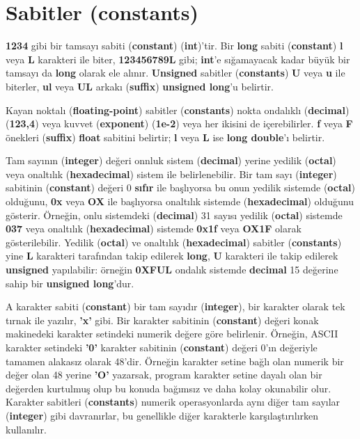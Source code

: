 \documentclass[a4paper,12pt,oneside]{book}
\begin{document}
\section{Sabitler (\textbf{constants})}
\textbf{1234} gibi bir tamsayı sabiti (\textbf{constant}) (\textbf{int})'tir. Bir \textbf{long} sabiti (\textbf{constant}) \textbf{l} veya \textbf{L} karakteri ile biter, \textbf{123456789L} gibi; \textbf{int}'e sığamayacak kadar büyük bir tamsayı da \textbf{long} olarak ele alınır. \textbf{Unsigned} sabitler (\textbf{constants}) \textbf{U} veya \textbf{u} ile biterler, \textbf{ul} veya \textbf{UL} arkakı (\textbf{suffix}) \textbf{unsigned long}'u belirtir.
\par Kayan noktalı (\textbf{floating-point}) sabitler (\textbf{constants}) nokta ondalıklı (\textbf{decimal}) (\textbf{123,4}) veya kuvvet (\textbf{exponent}) (\textbf{1e-2}) veya her ikisini de içerebilirler. \textbf{f} veya \textbf{F} önekleri (\textbf{suffix}) \textbf{float} sabitini belirtir; \textbf{l} veya \textbf{L} ise \textbf{long double}'ı belirtir.
\par Tam sayının (\textbf{integer}) değeri onnluk sistem (\textbf{decimal}) yerine yedilik (\textbf{octal}) veya onaltılık (\textbf{hexadecimal}) sistem ile belirlenebilir. Bir tam sayı (\textbf{integer}) sabitinin (\textbf{constant}) değeri 0 \textbf{sıfır} ile başlıyorsa bu onun yedilik sistemde (\textbf{octal}) olduğunu, \textbf{0x} veya \textbf{OX} ile başlıyorsa onaltılık sistemde (\textbf{hexadecimal}) olduğunu gösterir. Örneğin, onlu sistemdeki (\textbf{decimal}) 31 sayısı yedilik (\textbf{octal}) sistemde \textbf{037} veya onaltılık (\textbf{hexadecimal}) sistemde \textbf{0x1f} veya \textbf{OX1F} olarak gösterilebilir. Yedilik (\textbf{octal}) ve onaltılık (\textbf{hexadecimal}) sabitler (\textbf{constants}) yine \textbf{L} karakteri tarafından takip edilerek \textbf{long}, \textbf{U} karakteri ile takip edilerek \textbf{unsigned} yapılabilir: örneğin \textbf{0XFUL} ondalık sistemde \textbf{decimal} 15 değerine sahip bir \textbf{unsigned long}'dur.
\par A karakter sabiti (\textbf{constant}) bir tam sayıdır (\textbf{integer}), bir karakter olarak tek tırnak ile yazılır, \textbf{'x'} gibi. Bir karakter sabitinin (\textbf{constant}) değeri konak makinedeki karakter setindeki numerik değere göre belirlenir. Örneğin, ASCII karakter setindeki \textbf{'0'} karakter sabitinin (\textbf{constant}) değeri 0'ın değeriyle tamamen alakasız olarak 48'dir. Örneğin karakter setine bağlı olan numerik bir değer olan 48 yerine \textbf{'O'} yazarsak, program karakter setine dayalı olan bir değerden kurtulmuş olup bu konuda bağımsız ve daha kolay okunabilir olur. Karakter sabitleri (\textbf{constants}) numerik operasyonlarda aynı diğer tam sayılar (\textbf{integer}) gibi davranırlar, bu genellikle diğer karakterle karşılaştırılırken kullanılır.
\end{document}
